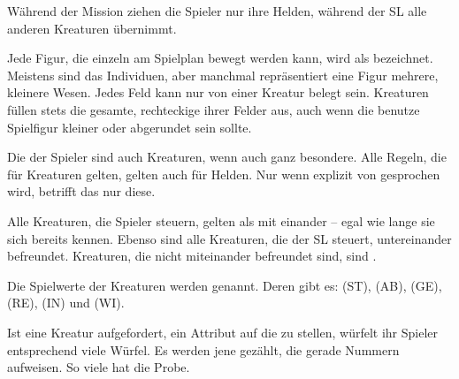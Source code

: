 {		Während der Mission ziehen die Spieler nur ihre Helden, während der SL alle anderen Kreaturen übernimmt.

		Jede Figur, die einzeln am Spielplan bewegt werden kann, wird als  bezeichnet. Meistens sind das Individuen, aber manchmal repräsentiert eine Figur mehrere, kleinere Wesen. Jedes Feld kann nur von einer Kreatur belegt sein. Kreaturen füllen stets die gesamte, rechteckige  ihrer Felder aus, auch wenn die benutze Spielfigur kleiner oder abgerundet sein sollte.


		\noindent
		Die  der Spieler sind auch Kreaturen, wenn auch ganz besondere. Alle Regeln, die für Kreaturen gelten, gelten auch für Helden. Nur wenn explizit von  gesprochen wird, betrifft das nur diese.


		\noindent
		Alle Kreaturen, die Spieler steuern, gelten als mit einander  -- egal wie lange sie sich bereits kennen. Ebenso sind alle Kreaturen, die der SL steuert, untereinander befreundet. Kreaturen, die nicht miteinander befreundet sind, sind .


		Die Spielwerte der Kreaturen werden  genannt. Deren gibt es:  (ST),  (AB),  (GE),  (RE),  (IN) und  (WI).

		Ist eine Kreatur aufgefordert, ein Attribut auf die  zu stellen, würfelt ihr Spieler entsprechend viele Würfel. Es werden jene gezählt, die gerade Nummern aufweisen. So viele  hat die Probe.


}
